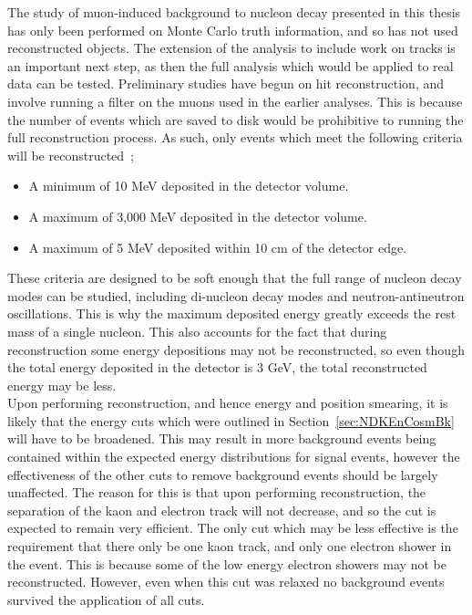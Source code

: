 The study of muon-induced background to nucleon decay presented in this thesis has only been performed on Monte Carlo truth information, and so has not used reconstructed objects. The extension of the analysis to include work on tracks is an important next step, as then the full analysis which would be applied to real data can be tested. Preliminary studies have begun on hit reconstruction, and involve running a filter on the muons used in the earlier analyses. This is because the number of events which are saved to disk would be prohibitive to running the full reconstruction process. As such, only events which meet the following criteria will be reconstructed~\citep{CosmoJanCollabMeeting};
\begin{itemize}
\item A minimum of 10 MeV deposited in the detector volume.
\item A maximum of 3,000 MeV deposited in the detector volume.
\item A maximum of 5 MeV deposited within 10 cm of the detector edge.
\end{itemize}
These criteria are designed to be soft enough that the full range of nucleon decay modes can be studied, including di-nucleon decay modes and neutron-antineutron oscillations. This is why the maximum deposited energy greatly exceeds the rest mass of a single nucleon. This also accounts for the fact that during reconstruction some energy depositions may not be reconstructed, so even though the total energy deposited in the detector is 3 GeV, the total reconstructed energy may be less. \\

Upon performing reconstruction, and hence energy and position smearing, it is likely that the energy cuts which were outlined in Section~\ref{sec:NDKEnCosmBk} will have to be broadened. This may result in more background events being contained within the expected energy distributions for signal events, however the effectiveness of the other cuts to remove background events should be largely unaffected. The reason for this is that upon performing reconstruction, the separation of the kaon and electron track will not decrease, and so the cut is expected to remain very efficient. The only cut which may be less effective is the requirement that there only be one kaon track, and only one electron shower in the event. This is because some of the low energy electron showers may not be reconstructed. However, even when this cut was relaxed no background events survived the application of all cuts. \\

